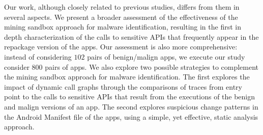 Our work, although closely related to previous studies, differs from them in several aspects. We present a broader assessment of the effectiveness of the mining sandbox approach for malware identification, resulting in the first in depth characterization of the calls to sensitive APIs that frequently appear in the repackage version of the apps. Our assessment is also more comprehensive: instead of considering $102$ pairs of benign/malign apps, we execute our study consider {\color{red}800} pairs of apps. We also explore two possible strategies to complement the mining sandbox approach for malware identification. The first explores the impact of dynamic call graphs through the comparisons of traces from entry point to the calls to sensitive APIs that result from the executions of the benign and malign versions of an app. The second explores suspicious change patterns in the Android Manifest file of the apps, using a simple, yet effective, static analysis approach.
